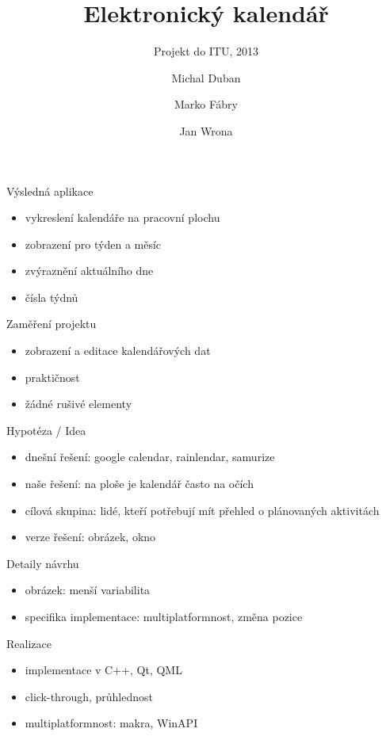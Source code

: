 \documentclass[17pt]{beamer}
\title[Kalendář]{Elektronický kalendář}
\subtitle{Projekt do ITU, 2013}
\author[Zadání 23]{Michal Duban \and Marko Fábry \and Jan Wrona}
\institute[FIT VUT]{Vysoké učení technické v Brně}
\begin{document}
\frame{\titlepage}

\begin{frame}{Výsledná aplikace}
\begin{itemize}
    \item vykreslení kalendáře na pracovní plochu
    \item zobrazení pro týden a měsíc
    \item zvýraznění aktuálního dne
    \item čísla týdnů
\end{itemize}
\end{frame}

\begin{frame}{Zaměření projektu}
\begin{itemize}
    \item zobrazení a editace kalendářových dat
    \item praktičnost
    \item žádné rušivé elementy
\end{itemize}
\end{frame}

\begin{frame}{Hypotéza / Idea}
\begin{itemize}
    \item dnešní řešení: google calendar, rainlendar, samurize
    \item naše řešení: na ploše je kalendář často na očích
    \item cílová skupina: lidé, kteří potřebují mít přehled o plánovaných aktivitách
    \item verze řešení: obrázek, okno
\end{itemize}
\end{frame}

\begin{frame}{Detaily návrhu}
\begin{itemize}
    \item obrázek: menší variabilita
    \item specifika implementace: multiplatformnost, změna pozice
\end{itemize}
\end{frame}

\begin{frame}{Realizace}
\begin{itemize}
    \item implementace v C++, Qt, QML
    \item click-through, průhlednost
    \item multiplatformnost: makra, WinAPI
\end{itemize}
\end{frame}
\end{document}
